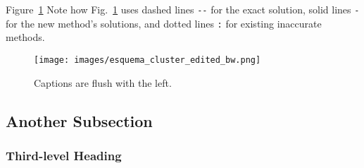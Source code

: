 \documentclass{anstrans}
\begin{document}
Figure~\ref{fig:esquema-cluster}
Note how Fig.~\ref{fig:esquema-cluster} uses dashed lines \verb|--| for the exact
solution, solid lines \verb|-| for the new method's solutions, and dotted lines
\verb|:| for existing inaccurate methods.
\begin{figure}[ht] %
  \centering
  \texttt{[image: images/esquema\_cluster\_edited\_bw.png]}
  \caption{Captions are flush with the left.}
  \label{fig:esquema-cluster}
\end{figure}


\subsection{Another Subsection}

\subsubsection{Third-level Heading}
\end{document}
